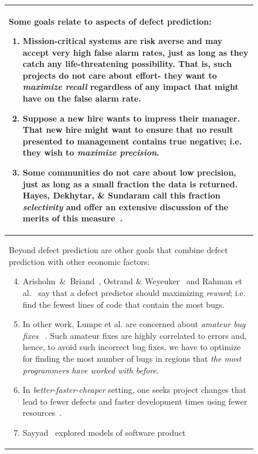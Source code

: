 \documentclass[sigconf,anonymous,review]{acmart}
\begin{document}
 \begin{figure}[b]
\small

\begin{tabular}{p{.95\linewidth}}\hline 
\rowcolor{gray!10}
Some goals relate to aspects of defect prediction:
\begin{enumerate}[leftmargin=0.4cm]
 
\item
Mission-critical systems are risk averse and may accept very high false alarm rates,
just as long as they catch any life-threatening possibility. That is, such projects
do not care about effort- they want to {\em maximize recall} regardless of any impact
that might have on the false alarm rate.
\item  Suppose a new hire wants
 to impress their manager. That
 new hire might want to ensure that no result presented to  management contains  true negative;
i.e. they wish to {\em maximize precision}.
\item
Some communities do not care about   low precision,
just as long as a small fraction the data is returned. Hayes, Dekhytar, \& Sundaram call this fraction
{\em selectivity} and offer an
extensive discussion of the merits of this measure~\cite{hayes06}.
\end{enumerate}
\\ \hline
\rowcolor{gray!10}
Beyond defect prediction are other goals that combine defect prediction with other economic
factors:
\begin{enumerate}[leftmargin=0.4cm]
\setcounter{enumi}{3}
\item
Arisholm~\&~Briand~\cite{arisholm06},  Ostrand \& Weyeuker~\cite{ostrand04} and Rahman et al.~\cite{rahman12}
say that a defect predictor should maximizing {\em reward}; i.e. find the fewest lines of code
that contain the most bugs.
\item In other work, Lumpe et al. are concerned about
 {\em amateur  bug fixes}
~\cite{me11f}.
Such amateur fixes are highly correlated to errors and, hence, to
avoid such incorrect bug fixes, we have to optimize
for finding the most number of bugs in regions that {\em the most programmers have worked with before}.
\item In {\em better-faster-cheaper} setting, one seeks  project changes that lead
to fewer defects and faster development times using fewer resources~\cite{elrawas10,me07f,me09a,me09f}.
\item
Sayyad~\cite{sayyad13a,sayyad13b} explored models of software product

\end{enumerate}
\end{tabular}
\end{figure}
\end{document}
